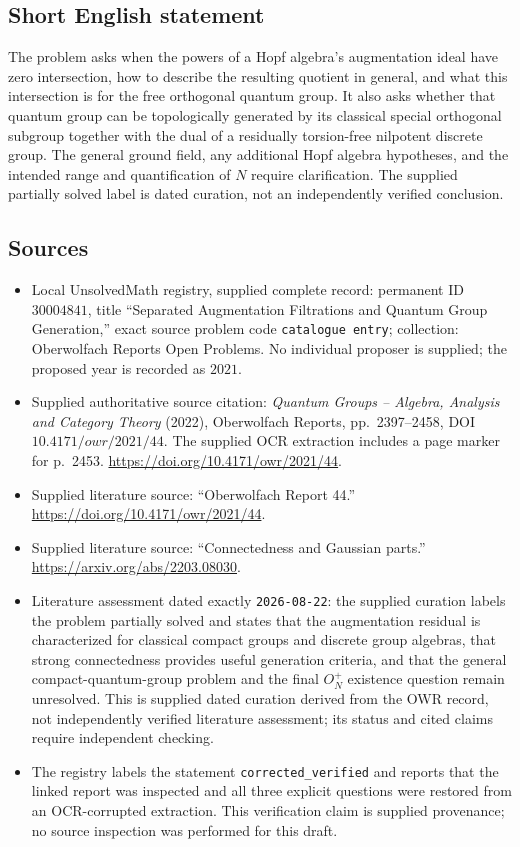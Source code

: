\documentclass[11pt]{article}
\begin{document}
\subsection{Short English statement}
The problem asks when the powers of a Hopf algebra's augmentation ideal have zero intersection, how to describe the resulting quotient in general, and what this intersection is for the free orthogonal quantum group. It also asks whether that quantum group can be topologically generated by its classical special orthogonal subgroup together with the dual of a residually torsion-free nilpotent discrete group. The general ground field, any additional Hopf algebra hypotheses, and the intended range and quantification of \(N\) require clarification. The supplied partially solved label is dated curation, not an independently verified conclusion.
\subsection{Sources}
\begin{itemize}
\item Local UnsolvedMath registry, supplied complete record: permanent ID \(30004841\), title ``Separated Augmentation Filtrations and Quantum Group Generation,'' exact source problem code \texttt{catalogue entry}; collection: Oberwolfach Reports Open Problems. No individual proposer is supplied; the proposed year is recorded as \(2021\).
\item Supplied authoritative source citation: \emph{Quantum Groups -- Algebra, Analysis and Category Theory} (2022), Oberwolfach Reports, pp.\ 2397--2458, DOI \(10.4171/owr/2021/44\). The supplied OCR extraction includes a page marker for p.\ 2453. \url{https://doi.org/10.4171/owr/2021/44}.
\item Supplied literature source: ``Oberwolfach Report 44.'' \url{https://doi.org/10.4171/owr/2021/44}.
\item Supplied literature source: ``Connectedness and Gaussian parts.'' \url{https://arxiv.org/abs/2203.08030}.
\item Literature assessment dated exactly \texttt{2026-08-22}: the supplied curation labels the problem partially solved and states that the augmentation residual is characterized for classical compact groups and discrete group algebras, that strong connectedness provides useful generation criteria, and that the general compact-quantum-group problem and the final \(O_N^+\) existence question remain unresolved. This is supplied dated curation derived from the OWR record, not independently verified literature assessment; its status and cited claims require independent checking.
\item The registry labels the statement \texttt{corrected\_verified} and reports that the linked report was inspected and all three explicit questions were restored from an OCR-corrupted extraction. This verification claim is supplied provenance; no source inspection was performed for this draft.
\end{itemize}
\end{document}

